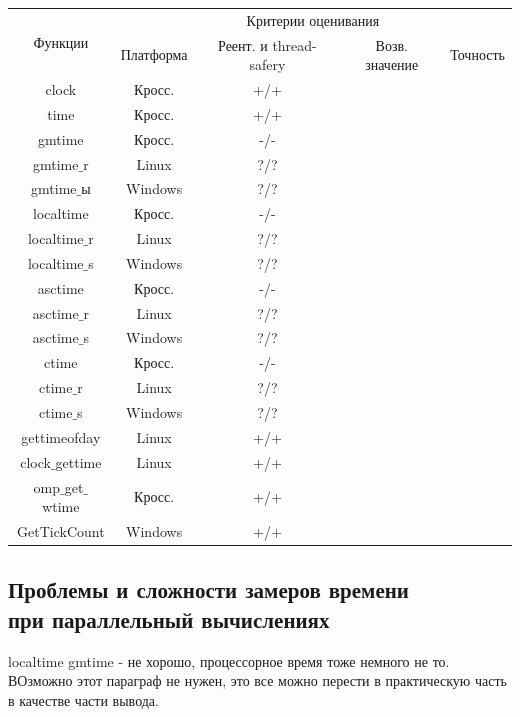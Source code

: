 \documentclass{article}
\begin{document}
			\begin{table}
			\begin{tabular}{|c|c|c|c|c|} 
			\hline
			\multirow{2}{*}{Функции} & \multicolumn{4}{|c|}{ Критерии оценивания	}\\
			\cline{2-5}
			\qquad & Платформа & Реент. и thread-safery & Возв. значение & Точность \\
			\hline
			clock				& Кросс. 	 & +/+ &  &						\\
			time				& Кросс. 	 & +/+ &  &						\\
			gmtime				& Кросс. 	 & -/- &  &						\\
			gmtime$\_$r 		& Linux 	 & ?/? &  &						\\
			gmtime$\_$ы 		& Windows 	 & ?/? &  &						\\
			localtime 			& Кросс. 	 & -/- &  &						\\
			localtime$\_$r		& Linux 	 & ?/? &  &						\\
			localtime$\_$s		& Windows 	 & ?/? &  &						\\
			asctime		 		& Кросс. 	 & -/- &  &						\\
			asctime$\_$r 		& Linux 	 & ?/? &  &						\\
			asctime$\_$s 		& Windows 	 & ?/? &  &						\\
			ctime				& Кросс. 	 & -/- &  &						\\
			ctime$\_$r			& Linux 	 & ?/? &  &						\\
			ctime$\_$s			& Windows 	 & ?/? &  &						\\
			gettimeofday		& Linux 	 & +/+ &  &						\\
			clock$\_$gettime	& Linux 	 & +/+ &  &						\\
			omp$\_$get$\_$wtime	& Кросс. 	 & +/+ &  &						\\
			GetTickCount		& Windows 	 & +/+ &  & 						\\
			\hline
			\end{tabular}		
		\end{table}	
			
			
		\newpage
		\subsection{Проблемы и сложности замеров времени \\ при параллельный вычислениях}
			localtime gmtime - не хорошо, процессорное время тоже немного не то. ВОзможно этот параграф не нужен, это все можно 			перести в практическую часть в качестве части вывода.
	\newpage
\end{document}
